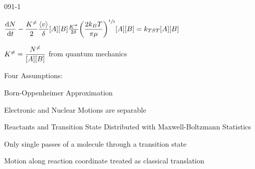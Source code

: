 \begin{mitframe}{091-1}
 \begin{listone}
	\item $\dfrac{\mathrm{d}\nummoles}{\mathrm{d}\timet}-\dfrac{\dilfac^{\neq}}{2}\dfrac{\langle\vvel\rangle}{\blthick}[\helmholtz][\exergy]\frac{\dilfac^{\neq}}{2\blthick}\bigg(\dfrac{2\thermcond_{\exergy}\Temp}{\pi\chempot}\bigg)^{\sfrac{1}{2}}[\helmholtz][\exergy]=\thermcond_{TST}[\helmholtz][\exergy]$
    
    	\begin{listtwo}
        	\item $\dilfac^{\neq}=\dfrac{\nummoles^{\neq}}{[\helmholtz][\exergy]}$ from quantum mechanics
            
        \end{listtwo}
\item Four Assumptions:
	\begin{listtwo}
    	\item Born-Oppenheimer Approximation
        	\begin{listthree}
            	\item Electronic and Nuclear Motions are separable
            \end{listthree}
    	\item Reactants and Transition State Distributed with Maxwell-Boltzmann Statistics
        \item Only single passes of a molecule through a transition state
        \item Motion along reaction coordinate treated as classical translation
    \end{listtwo}
\end{listone}   
\end{mitframe}